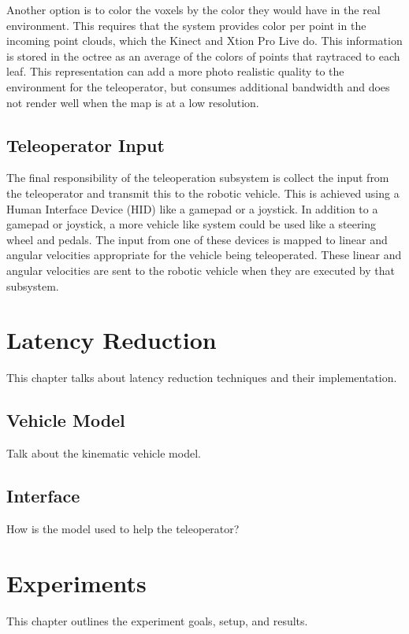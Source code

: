 \documentclass[12pt]{report}
\begin{document}
Another option is to color the voxels by the color they would have in the real environment.  This requires that the system provides color per point in the incoming point clouds, which the Kinect and Xtion Pro Live do.  This information is stored in the octree as an average of the colors of points that raytraced to each leaf.  This representation can add a more photo realistic quality to the environment for the teleoperator, but consumes additional bandwidth and does not render well when the map is at a low resolution.

\section{Teleoperator Input}
The final responsibility of the teleoperation subsystem is collect the input from the teleoperator and transmit this to the robotic vehicle.  This is achieved using a Human Interface Device (HID) like a gamepad or a joystick.  In addition to a gamepad or joystick, a more vehicle like system could be used like a steering wheel and pedals.  The input from one of these devices is mapped to linear and angular velocities appropriate for the vehicle being teleoperated.  These linear and angular velocities are sent to the robotic vehicle when they are executed by that subsystem.


\chapter{Latency Reduction}\label{chap:latency_reduction}
This chapter talks about latency reduction techniques and their implementation.

\section{Vehicle Model}
Talk about the kinematic vehicle model.

\section{Interface}
How is the model used to help the teleoperator?


\chapter{Experiments}\label{chap:experiments}
This chapter outlines the experiment goals, setup, and results.
\end{document}
